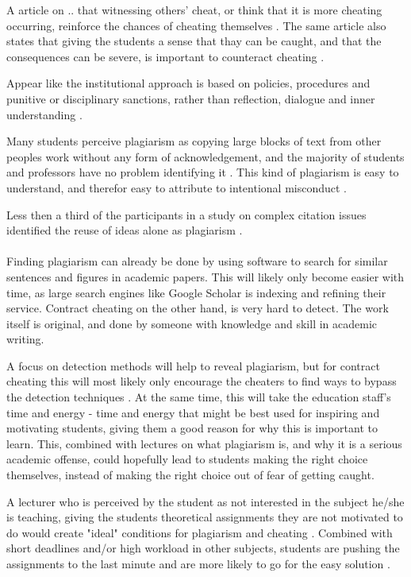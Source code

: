 \documentclass[10pt,a4paper]{article}
\begin{document}
A article on .. that witnessing others' cheat, or think that it is more cheating occurring, reinforce the chances of cheating themselves \cite{Rettinger2009}. The same article also states that giving the students a sense that thay can be caught, and that the consequences can be severe, is important to counteract cheating \cite{Rettinger2009}.

Appear like the institutional approach is based on policies, procedures and punitive or disciplinary sanctions, rather than reflection, dialogue and inner understanding  \cite{Dalal2015}.

Many students perceive plagiarism as copying large blocks of text from other peoples work without any form of acknowledgement, and the majority of students and professors have no problem identifying it \cite{Childers2016}. This kind of plagiarism is easy to understand, and therefor easy to attribute to intentional misconduct \cite{Childers2016}.

Less then a third of the participants in a study on complex citation issues identified the reuse of ideas alone as plagiarism \cite{Childers2016}.
\\ \\ %
Finding plagiarism can already be done by using software to search for similar sentences and figures in academic papers. This will likely only become easier with time, as large search engines like Google Scholar is indexing and refining their service. Contract cheating on the other hand, is very hard to detect. The work itself is original, and done by someone with knowledge and skill in academic writing. 

A focus on detection methods will help to reveal plagiarism, but for contract cheating this will most likely only encourage the cheaters to find ways to bypass the detection techniques \cite{Walker2012}. At the same time, this will take the education staff's time and energy - time and energy that might be best used for inspiring and motivating students, giving them a good reason for why this is important to learn. This, combined with lectures on what plagiarism is, and why it is a serious academic offense, could hopefully lead to students making the right choice themselves, instead of making the right choice out of fear of getting caught.

A lecturer who is perceived by the student as not interested in the subject he/she is teaching, giving the students theoretical assignments they are not motivated to do would create "ideal" conditions for plagiarism and cheating \cite{Comas2010}. Combined with short deadlines and/or high workload in other subjects, students are pushing the assignments to the last minute and are more likely to go for the easy solution \cite{Comas2010}. 
\end{document}

